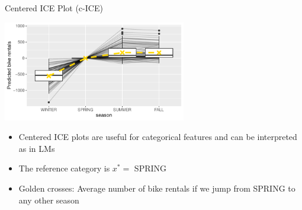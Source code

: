 \documentclass[11pt,compress,t,notes=noshow, aspectratio=169, xcolor=table]{beamer}
\begin{document}
\begin{frame}{Centered ICE Plot (c-ICE)}

\begin{center}
\includegraphics[width=0.6\textwidth]{figure/cICEcat}
\end{center}

\begin{itemize}
\item Centered ICE plots are useful for categorical features and can be interpreted as in LMs
\item The reference category is $x^* =$ SPRING
\item Golden crosses: Average number of bike rentals if we jump from SPRING to any other season
\end{itemize}

\end{frame}


%
%


\end{document}
